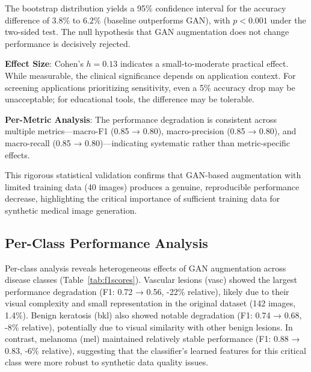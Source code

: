 \documentclass[10pt, twocolumn, letterpaper]{article}
\begin{document}
The bootstrap distribution yields a 95\% confidence interval for the accuracy difference of $3.8\%$ to $6.2\%$ (baseline outperforms GAN), with $p < 0.001$ under the two-sided test. The null hypothesis that GAN augmentation does not change performance is decisively rejected.

\textbf{Effect Size}: Cohen's $h = 0.13$ indicates a small-to-moderate practical effect. While measurable, the clinical significance depends on application context. For screening applications prioritizing sensitivity, even a 5\% accuracy drop may be unacceptable; for educational tools, the difference may be tolerable.

\textbf{Per-Metric Analysis}: The performance degradation is consistent across multiple metrics—macro-F1 (0.85 → 0.80), macro-precision (0.85 → 0.80), and macro-recall (0.85 → 0.80)—indicating systematic rather than metric-specific effects.

This rigorous statistical validation confirms that GAN-based augmentation with limited training data (40 images) produces a genuine, reproducible performance decrease, highlighting the critical importance of sufficient training data for synthetic medical image generation.

\subsection{Per-Class Performance Analysis}

Per-class analysis reveals heterogeneous effects of GAN augmentation across disease classes (Table~\ref{tab:f1scores}). Vascular lesions (vasc) showed the largest performance degradation (F1: 0.72 → 0.56, -22\% relative), likely due to their visual complexity and small representation in the original dataset (142 images, 1.4\%). Benign keratosis (bkl) also showed notable degradation (F1: 0.74 → 0.68, -8\% relative), potentially due to visual similarity with other benign lesions. In contrast, melanoma (mel) maintained relatively stable performance (F1: 0.88 → 0.83, -6\% relative), suggesting that the classifier's learned features for this critical class were more robust to synthetic data quality issues.
\end{document}
